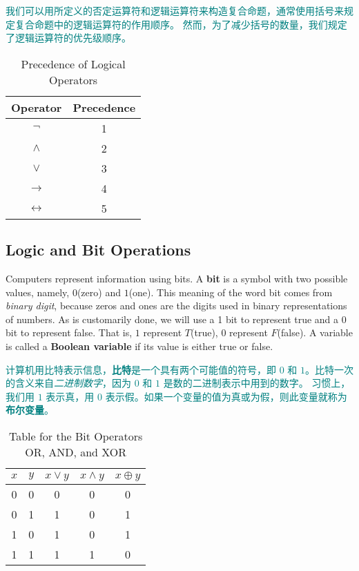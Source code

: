 \documentclass[12pt, a4paper]{article} %
\begin{document}
\textcolor{teal}{
    我们可以用所定义的否定运算符和逻辑运算符来构造复合命题，通常使用括号来规定复合命题中的逻辑运算符的作用顺序。
    然而，为了减少括号的数量，我们规定了逻辑运算符的优先级顺序。
}

\begin{table}[H]
    \centering
    \caption{Precedence of Logical Operators}
    \begin{tabular}{c|c}
        \toprule
        Operator          & Precedence \\
        \midrule
        $\neg$            & 1          \\
        \midrule
        $\wedge$          & 2          \\
        $\vee$            & 3          \\
        \midrule
        $\to$             & 4          \\
        $\leftrightarrow$ & 5          \\
        \bottomrule
    \end{tabular}%
    \label{tab:8}%
\end{table}%

\subsection{Logic and Bit Operations}

Computers represent information using bits. A \textbf{bit} is a symbol with two possible values, namely, $0$(zero) and $1$(one). This meaning of the word bit comes from \textit{binary digit}, because zeros and ones are the digits used in binary representations of numbers.
As is customarily done, we will use a 1 bit to represent true and a 0 bit to represent false. That is, $1$ represent $T$(true), $0$ represent $F$(false). A variable is called a \textbf{Boolean variable} if its value is either true or false.

\textcolor{teal}{
    计算机用比特表示信息，\textbf{比特}是一个具有两个可能值的符号，即 $0$ 和 $1$。比特一次的含义来自\textit{二进制数字}，因为 $0$ 和 $1$ 是数的二进制表示中用到的数字。
    习惯上，我们用 $1$ 表示真，用 $0$ 表示假。如果一个变量的值为真或为假，则此变量就称为\textbf{布尔变量}。
}

\begin{table}[H]
    \centering
    \caption{Table for the Bit Operators OR, AND, and XOR}
    \begin{tabular}{cc|ccc}
        \toprule
        $x$ & $y$ & $x \vee y$ & $x \wedge y$ & $x \oplus y$ \\
        \midrule
        0   & 0   & 0          & 0            & 0            \\
        0   & 1   & 1          & 0            & 1            \\
        1   & 0   & 1          & 0            & 1            \\
        1   & 1   & 1          & 1            & 0            \\
        \bottomrule
    \end{tabular}%
    \label{tab:9}%
\end{table}%
\end{document}

